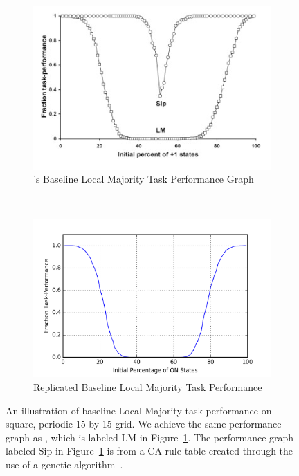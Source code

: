 \documentclass[a4paper,11pt,twoside]{report}
\begin{document}
\begin{figure}[htp]
\centering
  \begin{subfigure}[t]{0.6\textwidth}
  \includegraphics[width=\textwidth]{ch5_figs/me07_fig2_LMBaseline}
  \caption{\citeauthor{me07}'s Baseline Local Majority Task Performance Graph}
  \label{fig:me07_baseline}
  \end{subfigure}
  ~
  \begin{subfigure}[t]{0.6\textwidth}
  \centering
  \includegraphics[width=\textwidth]{ch5_figs/lm_baseline_reg_tor}
  \caption{Replicated Baseline Local Majority Task Performance}
  \end{subfigure}
\caption[Replication of \citeauthor{me07}'s Baseline Local Majority Performance]{
  An illustration of baseline Local Majority task performance on square, periodic 15 by 15 grid. We achieve the same performance graph as \citeauthor{me07}, which is labeled LM in Figure~\ref{fig:me07_baseline}. The performance graph labeled Sip in Figure~\ref{fig:me07_baseline} is from a CA rule table created through the use of a genetic algorithm~\cite{me07}.
}
\label{fig:me07_baseline_rep}
\end{figure}
\end{document}
